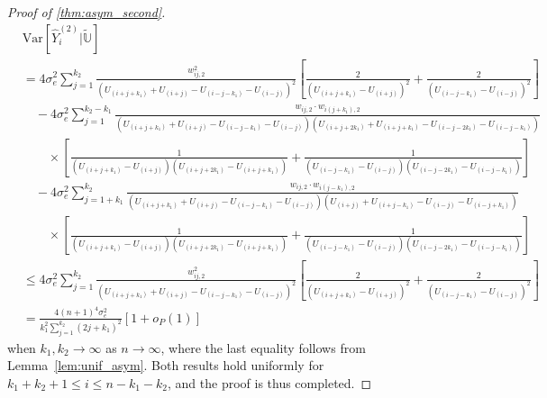 \documentclass{uwstat572}
\theoremstyle{definition}
\renewcommand{\hat}{\widehat}
\renewcommand{\tilde}{\widetilde}
\theoremstyle{theorem}
\begin{document}
\begin{proof}[Proof of \autoref{thm:asym_second}]
\begin{align*}
&\mathrm{Var}\left[\hat{Y}_i^{(2)}\big| \tilde{\mathbb{U}}\right] \\
&= 4\sigma_e^2 \sum_{j=1}^{k_2} \frac{w_{ij,2}^2}{\left(U_{(i+j+k_1)} + U_{(i+j)} - U_{(i-j-k_1)} -U_{(i-j)}\right)^2} \left[\frac{2}{\left(U_{(i+j+k_1)} -U_{(i+j)}\right)^2} + \frac{2}{\left(U_{(i-j-k_1)} -U_{(i-j)}\right)^2} \right]\\
&\quad -4\sigma_e^2 \sum_{j=1}^{k_2-k_1} \frac{w_{ij,2} \cdot w_{i(j+k_1),2}}{\left(U_{(i+j+k_1)} + U_{(i+j)} - U_{(i-j-k_1)} -U_{(i-j)}\right) \left(U_{(i+j+2k_1)} + U_{(i+j+k_1)} - U_{(i-j-2k_1)} -U_{(i-j-k_1)} \right)}\\
&\quad \quad \times \left[\frac{1}{\left(U_{(i+j+k_1)} - U_{(i+j)}\right)\left(U_{(i+j+2k_1)} - U_{(i+j+k_1)}\right)} + \frac{1}{\left(U_{(i-j-k_1)} - U_{(i-j)}\right)\left(U_{(i-j-2k_1)} - U_{(i-j-k_1)}\right)}\right] \\
&\quad -4\sigma_e^2 \sum_{j=1+k_1}^{k_2} \frac{w_{ij,2} \cdot w_{i(j-k_1),2}}{\left(U_{(i+j+k_1)} + U_{(i+j)} - U_{(i-j-k_1)} -U_{(i-j)}\right) \left(U_{(i+j)} + U_{(i+j-k_1)} - U_{(i-j)} -U_{(i-j+k_1)} \right)}\\
&\quad \quad \times \left[\frac{1}{\left(U_{(i+j+k_1)} - U_{(i+j)}\right)\left(U_{(i+j+2k_1)} - U_{(i+j+k_1)}\right)} + \frac{1}{\left(U_{(i-j-k_1)} - U_{(i-j)}\right)\left(U_{(i-j-2k_1)} - U_{(i-j-k_1)}\right)}\right] \\
&\leq 4\sigma_e^2 \sum_{j=1}^{k_2} \frac{w_{ij,2}^2}{\left(U_{(i+j+k_1)} + U_{(i+j)} - U_{(i-j-k_1)} -U_{(i-j)}\right)^2} \left[\frac{2}{\left(U_{(i+j+k_1)} -U_{(i+j)}\right)^2} + \frac{2}{\left(U_{(i-j-k_1)} -U_{(i-j)}\right)^2} \right]\\
&=\frac{4(n+1)^4\sigma_e^2}{k_1^2 \sum_{j=1}^{k_2}(2j+k_1)^2} \left[1+o_P(1)\right]
\end{align*}
when $k_1,k_2\to \infty$ as $n\to \infty$, where the last equality follows from Lemma~\ref{lem:unif_asym}. Both results hold uniformly for $k_1+k_2+1 \leq i\leq n-k_1-k_2$, and the proof is thus completed.
\end{proof}
\end{document}
